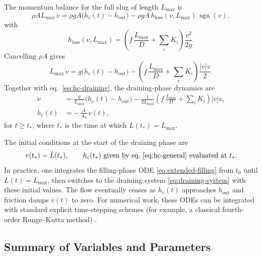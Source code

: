 \documentclass[11pt]{article}
\begin{document}
The momentum balance for the full slug of length $L_{\max}$ is
\[
\rho A L_{\max}\,\dot v
= \rho g A\bigl(h_c(t) - h_{\text{out}}\bigr)
  - \rho g A\,h_{\text{loss}}(v,L_{\max})\,\operatorname{sgn}(v),
\]
with
\[
h_{\text{loss}}(v,L_{\max})
= \left(
    f\,\frac{L_{\max}}{D}
    + \sum_i K_i
  \right)\frac{v^2}{2g}.
\]
Cancelling $\rho A$ gives
\[
L_{\max}\,\dot v
= g\bigl(h_c(t) - h_{\text{out}}\bigr)
  - \left(
      f\,\frac{L_{\max}}{D}
      + \sum_i K_i
    \right)\frac{|v|v}{2}.
\]
Together with eq.~\eqref{eq:hc-draining}, the draining-phase dynamics are
\begin{equation}
\boxed{
\begin{aligned}
\dot v
&= \frac{g}{L_{\max}}\bigl(h_c(t) - h_{\text{out}}\bigr)
   - \frac{1}{2L_{\max}}
     \left(
       f\,\frac{L_{\max}}{D}
       + \sum_i K_i
     \right)|v|v,
   \\[0.5em]
\dot h_c(t)
&= -\,\frac{A}{A_0}\,v(t),
\end{aligned}
}
\label{eq:draining-system}
\end{equation}
for $t \ge t_\ast$, where $t_\ast$ is the time at which $L(t_\ast)=L_{\max}$.

The initial conditions at the start of the draining phase are
\[
v(t_\ast) = \dot L(t_\ast), \qquad
h_c(t_\ast) \text{ given by eq.~\eqref{eq:hc-general} evaluated at } t_\ast.
\]
In practice, one integrates the filling-phase ODE \eqref{eq:extended-filling}
from $t_0$ until $L(t)=L_{\max}$, then switches to the draining system
\eqref{eq:draining-system} with these initial values. The flow eventually ceases
as $h_c(t)$ approaches $h_{\text{out}}$ and friction damps $v(t)$ to zero.  For
numerical work, these ODEs can be integrated with standard explicit
time-stepping schemes (for example, a classical fourth-order Runge--Kutta
method) \cite{hairer_ode}.

\subsection*{Summary of Variables and Parameters}
\end{document}
